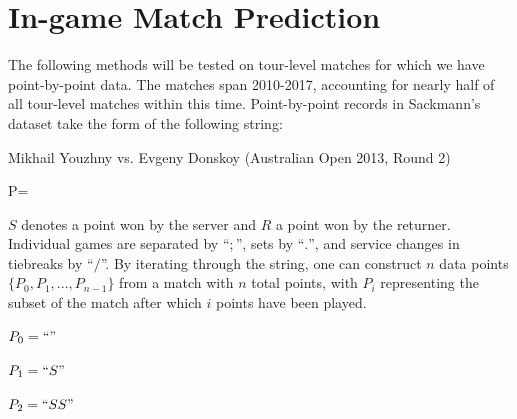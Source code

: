 \documentclass[chapterprefix=false]{report}
\begin{document}





\chapter{In-game Match Prediction}


The following methods will be tested on tour-level matches for which we have point-by-point data. The matches span 2010-2017, accounting for nearly half of all tour-level matches within this time. Point-by-point records in Sackmann's dataset take the form of the following string:

Mikhail Youzhny vs. Evgeny Donskoy (Australian Open 2013, Round 2)

P=


$S$ denotes a point won by the server and $R$ a point won by the returner. Individual games are separated by ``$;$'', sets by ``$.$'', and service changes in tiebreaks by ``$/$''. By iterating through the string, one can construct $n$ data points $\{P_0,P_1,...,P_{n-1}\}$ from a match with $n$ total points, with $P_i$ representing the subset of the match after which $i$ points have been played.

$P_0 = ``"$

$P_1 = ``S"$

$P_2 = ``SS"$
\end{document}
